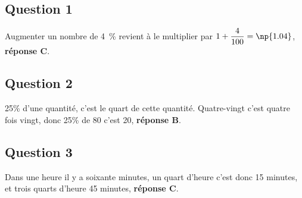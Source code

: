 %

\subsection*{Question 1}


Augmenter un nombre de 4~\% revient à le multiplier par \mbox{$1+\dfrac{4}{100}=\np{1.04}$}, \textbf{réponse C}.
%

\subsection*{Question 2}


%
25\% d'une quantité, c'est le quart de cette quantité. Quatre-vingt c'est quatre fois vingt, donc 25\% de 80 c'est 20, \textbf{réponse B}.
\subsection*{Question 3}


%
Dans une heure il y a soixante minutes, un quart d'heure c'est donc 15 minutes, et trois quarts d'heure 45 minutes, \textbf{réponse C}.
